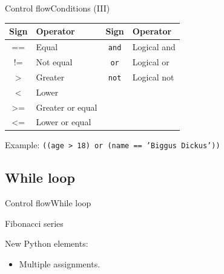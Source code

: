 \documentclass[10pt,compress]{beamer} %
\begin{document}
\begin{frame}[fragile]{Control flow}{Conditions (III)}
	\centering \begin{tabular}{cl|cl}\hline
	\sc Sign & \sc Operator & \sc Sign 	& \sc Operator \\ \hline
	== 	 & Equal   		& \texttt{and} 	& Logical and \\
	!= 	& Not equal  	& \texttt{or}	& Logical or  \\
	> 	& Greater 		& \texttt{not}	& Logical not \\
	< 	& Lower			&   	& \\
	>= 	& Greater or equal 		& 	& \\
	<= 	& Lower or equal 		& 	& \\\hline
	\end{tabular}

	\bigskip

	Example: \texttt{((age > 18) or (name == 'Biggus Dickus'))}
\end{frame}

\subsection{While loop}
\begin{frame}{Control flow}{While loop}
	\begin{exampleblock}{Fibonacci series}
	\vspace{-0.2cm}
		
	\end{exampleblock}

    New Python elements:
	\begin{itemize}
	\item Multiple assignments.
	\end{itemize}
\end{frame}
\end{document}
